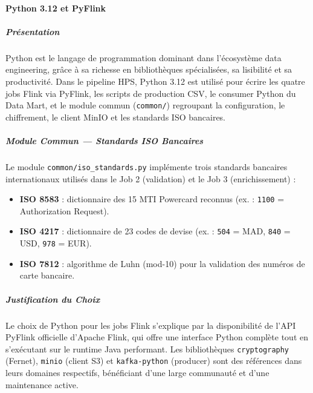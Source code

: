 \newpage

\paragraph{Python 3.12 et PyFlink}
\vspace{0.3cm}

\subparagraph{Présentation}
\vspace{0.1cm}
Python est le langage de programmation dominant dans l'écosystème data engineering, grâce à sa richesse en bibliothèques spécialisées, sa lisibilité et sa productivité. Dans le pipeline HPS, Python 3.12 est utilisé pour écrire les quatre jobs Flink via PyFlink, les scripts de production CSV, le consumer Python du Data Mart, et le module commun (\texttt{common/}) regroupant la configuration, le chiffrement, le client MinIO et les standards ISO bancaires.

\vspace{0.3cm}
\subparagraph{Module Commun --- Standards ISO Bancaires}
\vspace{0.1cm}
Le module \texttt{common/iso\_standards.py} implémente trois standards bancaires internationaux utilisés dans le Job 2 (validation) et le Job 3 (enrichissement) :
\begin{itemize}
    \item \textbf{ISO 8583} : dictionnaire des 15 MTI Powercard reconnus (ex. : \texttt{1100} = Authorization Request).
    \item \textbf{ISO 4217} : dictionnaire de 23 codes de devise (ex. : \texttt{504} = MAD, \texttt{840} = USD, \texttt{978} = EUR).
    \item \textbf{ISO 7812} : algorithme de Luhn (mod-10) pour la validation des numéros de carte bancaire.
\end{itemize}

\vspace{0.3cm}
\subparagraph{Justification du Choix}
\vspace{0.1cm}
Le choix de Python pour les jobs Flink s'explique par la disponibilité de l'API PyFlink officielle d'Apache Flink, qui offre une interface Python complète tout en s'exécutant sur le runtime Java performant. Les bibliothèques \texttt{cryptography} (Fernet), \texttt{minio} (client S3) et \texttt{kafka-python} (producer) sont des références dans leurs domaines respectifs, bénéficiant d'une large communauté et d'une maintenance active.

\newpage


